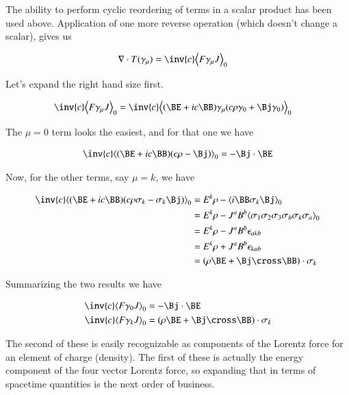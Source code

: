 The ability to perform cyclic reordering of terms in a scalar product has been used above.  Application of one more
reverse operation (which doesn't change a scalar), gives us

\begin{align}\label{eqn:seLorentz:lorentzForceTdivergence}
\grad \cdot T(\gamma_\mu) &= \inv{c} \gpgradezero{ F \gamma_\mu J } 
\end{align}

Let's expand the right hand size first.

\begin{align*}
\inv{c} \gpgradezero{ F \gamma_\mu J } &= \inv{c} \gpgradezero{ (\BE + i c \BB) \gamma_\mu (c \rho \gamma_0 + \Bj \gamma_0) } 
\end{align*}

The $\mu = 0$ term looks the easiest, and for that one we have

\begin{align*}
\inv{c} \gpgradezero{ (\BE + i c \BB) (c \rho - \Bj) }  = -\Bj \cdot \BE
\end{align*}

Now, for the other terms, say $\mu = k$, we have

\begin{align*}
\inv{c} \gpgradezero{ (\BE + i c \BB) (c \rho \sigma_k - \sigma_k \Bj ) } 
&= E^k \rho - \gpgradezero{ i \BB \sigma_k \Bj }  \\
&= E^k \rho - J^a B^b \gpgradezero{ \sigma_1 \sigma_2 \sigma_3 \sigma_b \sigma_k \sigma_a }  \\
&= E^k \rho - J^a B^b \epsilon_{a k b} \\
&= E^k \rho + J^a B^b \epsilon_{k a b} \\
&= (\rho \BE + \Bj \cross \BB) \cdot \sigma_k
\end{align*}

Summarizing the two results we have

\begin{align}\label{eqn:seLorentz:lorentzForcePair}
\inv{c} \gpgradezero{ F \gamma_0 J } &= -\Bj \cdot \BE \\
\inv{c} \gpgradezero{ F \gamma_k J } &= (\rho \BE + \Bj \cross \BB) \cdot \sigma_k
\end{align}

The second of these is easily recognizable as components of the Lorentz force for an element of charge (density).  The first
of these is actually the energy component of the four vector Lorentz force, so expanding that in terms of spacetime quantities
is the next order of business.

